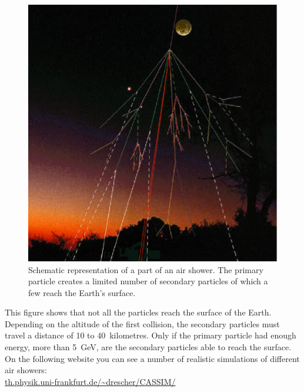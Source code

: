 \documentclass[12pt,a4paper]{article}
\numberwithin{equation}{section}
\numberwithin{figure}{section}
\numberwithin{table}{section}
\begin{document}
\begin{figure}\begin{center}
\includegraphics[scale=0.38]{shower.eps}%
\caption{Schematic representation of a part of an air shower. The primary particle creates a limited number of secondary particles of which a few reach the Earth's surface.}\label{fig:shower}
\end{center}\end{figure}

This figure shows that not all the particles reach the surface of the Earth. Depending on the altitude of the first collision, the secondary particles must travel a distance of 10 to 40~kilometres. Only if the primary particle had enough energy, more than 5~GeV, are the secondary particles able to reach the surface. On the following website you can see a number of realistic simulations of different air showers:\\
\url{th.physik.uni-frankfurt.de/\~drescher/CASSIM/}
\end{document}
